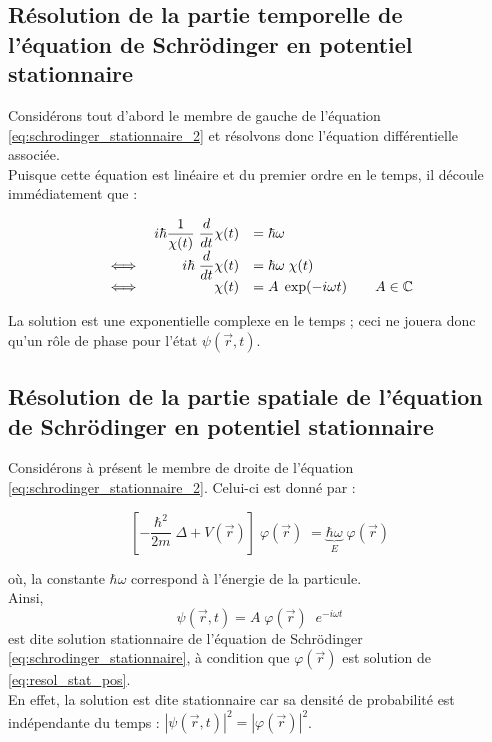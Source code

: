 \documentclass{book}
\begin{document}
\subsection{Résolution de la partie temporelle de l'équation de Schrödinger en potentiel stationnaire}
Considérons tout d'abord le membre de gauche de l'équation \eqref{eq:schrodinger_stationnaire_2} et résolvons donc l'équation différentielle associée. \\
Puisque cette équation est linéaire et du premier ordre en le temps, il découle immédiatement que :

\begin{equation} \label{eq:resol_stat_temps}
\begin{array}{lrl r}
& i\hbar \dfrac{1}{\chi(t)} \; \dfrac{d}{dt} \chi(t) &= \hbar \omega  &\\
\iff& i \hbar \; \dfrac{d}{dt} \chi(t) &= \hbar \omega \;  \chi(t)  &\\
\iff & \chi(t) &= A \; \exp(-i\omega t)  &\quad A \in \mathbb{C}
\end{array}
\end{equation}

La solution est une exponentielle complexe en le temps ; ceci ne jouera donc qu'un rôle de phase pour l'état $\psi(\vec{r},t)$. 


\subsection{Résolution de la partie spatiale de l'équation de Schrödinger en potentiel stationnaire}
Considérons à présent le membre de droite de l'équation \eqref{eq:schrodinger_stationnaire_2}. Celui-ci est donné par :

\begin{equation} \label{eq:resol_stat_pos}
\left[-\dfrac{\hbar ^2}{2m} \; \Delta + V(\vec r) \right] \; \varphi(\vec r) \; = \underbrace{\hbar	\omega}_E \; \varphi(\vec r)
\end{equation}

où, la constante $\hbar \omega$ correspond à l'énergie de la particule. \\

Ainsi, $$\psi(\vec r, t) = A \; \varphi(\vec r) \; \;e^{-i\omega t}$$ est dite solution stationnaire de l'équation de Schrödinger \eqref{eq:schrodinger_stationnaire}, à condition que $\varphi(\vec{r})$ est solution de \eqref{eq:resol_stat_pos}. \\
En effet, la solution est dite stationnaire car sa densité de probabilité est indépendante du temps : $\left| \psi(\vec{r}, t) \right|^2 = \left| \varphi(\vec{r}) \right|^2$. \\
\end{document}
